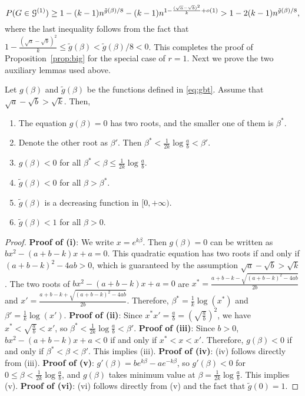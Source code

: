 \documentclass{article}
\begin{document}
$$
P(G\in\mathcal{G}^{(1)})\ge 1-(k-1)n^{\tilde{g}(\beta)/8}- (k-1)n^{1-\frac{(\sqrt{a}-\sqrt{b})^2}{k}+o(1)}> 1- 2(k-1)n^{\tilde{g}(\beta)/8},
$$
where the last inequality follows from the fact that $1-\frac{(\sqrt{a}-\sqrt{b})^2}{k}\le
\tilde{g}(\beta)<\tilde{g}(\beta)/8< 0$.
This completes the proof of Proposition~\ref{prop:big} for the special case of $r=1$. 
Next we prove the two auxiliary lemmas used above.
\begin{lemma} \label{lm:ele}
Let $g(\beta)$ and $\tilde{g}(\beta)$ be the functions defined in \eqref{eq:gbt}. Assume that $\sqrt{a}-\sqrt{b}>\sqrt{k}$.
Then,

\begin{enumerate}[label=(\roman*)]
\item The equation $g(\beta) = 0$ has two roots, and the smaller one of them is $\beta^\ast$.

\item Denote the other root as $\beta'$. Then
$\beta^\ast< \frac{1}{2k}\log\frac{a}{b} <\beta'$.

\item $g(\beta)<0$ for all $\beta^\ast< \beta \le \frac{1}{2k}\log\frac{a}{b}$.

\item $\tilde{g}(\beta)<0$ for all $\beta>\beta^\ast$.

\item $\tilde{g}(\beta)$ is a decreasing function in $[0,+\infty)$. 

\item $\tilde{g}(\beta)<1$ for all $\beta>0$.
\end{enumerate}
\end{lemma}
\begin{proof}
{\bf Proof of (i)}:
We write $x=e^{k\beta}$. Then $g(\beta)=0$ can be written as $bx^2-(a+b-k)x+a=0$. This quadratic equation has two roots if and only if $(a+b-k)^2-4ab>0$, which is guaranteed by the assumption $\sqrt{a}-\sqrt{b}>\sqrt{k}$.
The two roots of $bx^2-(a+b-k)x+a=0$ are
$x^\ast=\frac{a+b-k - \sqrt{(a+b-k)^2-4ab}}{2b}$ and $x'=\frac{a+b-k + \sqrt{(a+b-k)^2-4ab}}{2b}$.
Therefore, $\beta^\ast=\frac{1}{k}\log(x^\ast)$ and $\beta'=\frac{1}{k}\log(x')$.
{\bf Proof of (ii)}:
Since $x^\ast x'=\frac{a}{b}=(\sqrt{\frac{a}{b}})^2$, we have $x^\ast<\sqrt{\frac{a}{b}}<x'$, so $\beta^\ast< \frac{1}{2k}\log\frac{a}{b} <\beta'$.
{\bf Proof of (iii)}:
Since $b>0$, $bx^2-(a+b-k)x+a<0$ if and only if $x^\ast<x<x'$. Therefore, $g(\beta)<0$ if and only if $\beta^\ast< \beta <\beta'$. This implies (iii). 
{\bf Proof of (iv)}: (iv) follows directly from (iii).
{\bf Proof of (v)}: $g'(\beta)=b e^{k\beta} - a e^{-k\beta}$, so $g'(\beta)<0$ for $0\le \beta<\frac{1}{2k}\log\frac{a}{b}$, and $g(\beta)$ takes minimum value at $\beta=\frac{1}{2k}\log\frac{a}{b}$. This implies (v).
{\bf Proof of (vi)}: (vi) follows directly from (v) and the fact that $\tilde{g}(0)=1$.
\end{proof}
\end{document}
